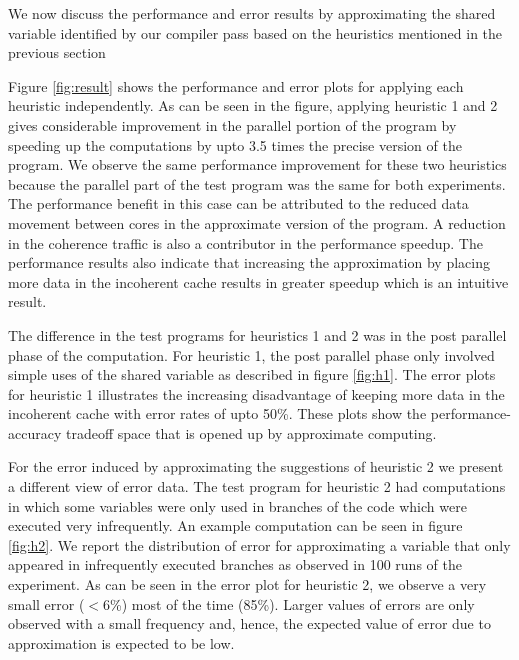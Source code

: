 \documentclass[12pt,conference]{IEEEtran}
\begin{document}
We now discuss the performance and error results by approximating the
shared variable identified by our compiler pass based on the heuristics mentioned
in the previous section

Figure \ref{fig:result} shows the performance and error plots for applying each
heuristic independently. As can be seen in the figure, applying heuristic 1 and 2
gives considerable improvement in the parallel portion of the program by speeding 
up the computations by upto 3.5 times the precise version of the program. We observe
the same performance improvement for these two heuristics because the parallel 
part of the test program was the same for both experiments. The performance benefit
in this case can be attributed to the reduced data movement between cores in the approximate
version of the program. A reduction in the coherence traffic is also a contributor in the 
performance speedup. The performance results also indicate that increasing the approximation 
by placing more data in the incoherent cache results in greater speedup which is an 
intuitive result. 

The difference in the test programs for heuristics 1 and 2 was in the post parallel phase 
of the computation. For heuristic 1, the post parallel phase only involved simple uses 
of the shared variable as described in figure \ref{fig:h1}. The error plots for heuristic 1
illustrates the increasing disadvantage of keeping more data in the incoherent cache with
error rates of upto 50\%. These plots show the performance-accuracy tradeoff space that is
opened up by approximate computing.

For the error induced by approximating the suggestions of heuristic 2 we present a different 
view of error data. The test program for heuristic 2 had computations in which some variables 
were only used in branches of the code which were executed very infrequently. An example computation
can be seen in figure \ref{fig:h2}. We report the distribution of error for approximating 
a variable that only appeared in infrequently executed branches as observed in 100 runs of the
experiment. As can be seen in the 
error plot for heuristic 2, we observe a very small error ($<$6\%) most of the time (85\%).
Larger values of errors are only observed with a small frequency and, hence, the expected
value of error due to approximation is expected to be low.
\end{document}

